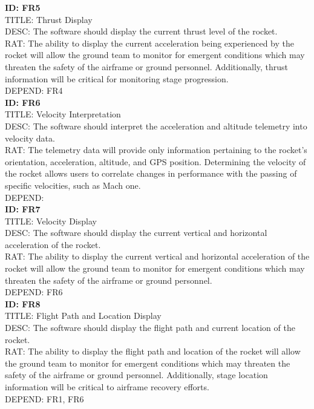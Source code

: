 \documentclass[onecolumn, draftclsnofoot,10pt, compsoc]{IEEEtran}
\begin{document}
			\noindent
			\textbf{ID: FR5}\\
			TITLE: Thrust Display\\
			DESC: The software should display the current thrust level of the rocket.\\
			RAT: The ability to display the current acceleration being experienced by the rocket will allow the ground team to monitor for emergent conditions which may threaten the safety of the airframe or ground personnel.
				Additionally, thrust information will be critical for monitoring stage progression.\\
			DEPEND: FR4\\
			
			\noindent
			\textbf{ID: FR6}\\
			TITLE: Velocity Interpretation\\
			DESC: The software should interpret the acceleration and altitude telemetry into velocity data.\\
			RAT: The telemetry data will provide only information pertaining to the rocket's orientation, acceleration, altitude, and GPS position.
				Determining the velocity of the rocket allows users to correlate changes in performance with the passing of specific velocities, such as Mach one.\\
			DEPEND: \\
			
			\noindent
			\textbf{ID: FR7}\\
			TITLE: Velocity Display\\
			DESC: The software should display the current vertical and horizontal acceleration of the rocket.\\
			RAT: The ability to display the current vertical and horizontal acceleration of the rocket will allow the ground team to monitor for emergent conditions which may threaten the safety of the airframe or ground personnel.\\
			DEPEND: FR6\\
			
			\noindent
			\textbf{ID: FR8}\\
			TITLE: Flight Path and Location Display\\
			DESC: The software should display the flight path and current location of the rocket.\\
			RAT: The ability to display the flight path and location of the rocket will allow the ground team to monitor for emergent conditions which may threaten the safety of the airframe or ground personnel.
				Additionally, stage location information will be critical to airframe recovery efforts.\\
			DEPEND: FR1, FR6\\
			
\end{document}
